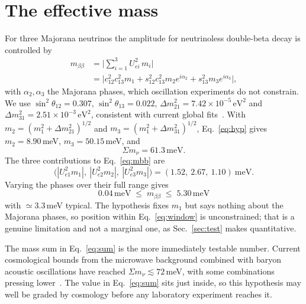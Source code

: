\documentclass[aps,prd,twocolumn,superscriptaddress,nofootinbib,10pt]{revtex4-2}
\begin{document}
\section{The effective mass}\label{sec:calc}

For three Majorana neutrinos the amplitude for neutrinoless double-beta decay is controlled by
%
\begin{equation}
  \begin{aligned}
    m_{\beta\beta} &= \Big| \sum_{i=1}^{3} U_{ei}^2\, m_i \Big| \\[2pt]
    &= \Big| c_{12}^2 c_{13}^2 m_1 + s_{12}^2 c_{13}^2 m_2 e^{i\alpha_2}
       + s_{13}^2 m_3 e^{i\alpha_3} \Big|,
  \end{aligned}
  \label{eq:mbb}
\end{equation}
%
with $\alpha_2, \alpha_3$ the Majorana phases, which oscillation experiments do not constrain. We
use $\sin^2\theta_{12} = 0.307$, $\sin^2\theta_{13} = 0.022$,
$\Delta m^2_{21} = 7.42 \times 10^{-5}\,\mathrm{eV}^2$ and
$\Delta m^2_{31} = 2.51 \times 10^{-3}\,\mathrm{eV}^2$, consistent with current global
fits~\cite{NuFIT2020,PDG2024}. With $m_2 = (m_1^2 + \Delta m^2_{21})^{1/2}$ and
$m_3 = (m_1^2 + \Delta m^2_{31})^{1/2}$, Eq.~\eqref{eq:hyp} gives
$m_2 = 8.90\,$meV, $m_3 = 50.15\,$meV, and
%
\begin{equation}
  \Sigma m_\nu = 61.3\,\mathrm{meV}.
  \label{eq:sum}
\end{equation}
%
The three contributions to Eq.~\eqref{eq:mbb} are
%
\begin{equation}
  \big( |U_{e1}^2 m_1|,\ |U_{e2}^2 m_2|,\ |U_{e3}^2 m_3| \big)
  = (1.52,\ 2.67,\ 1.10)\ \mathrm{meV}.
  \label{eq:terms}
\end{equation}
%
Varying the phases over their full range gives
%
\begin{equation}
  \boxed{\ 0.04\,\mathrm{meV} \;\le\; m_{\beta\beta} \;\le\; 5.30\,\mathrm{meV}\ }
  \label{eq:window}
\end{equation}
%
with $\simeq 3.3\,$meV typical. The hypothesis fixes $m_1$ but says nothing about the Majorana
phases, so position within Eq.~\eqref{eq:window} is unconstrained; that is a genuine limitation and
not a marginal one, as Sec.~\ref{sec:test} makes quantitative.

The mass sum in Eq.~\eqref{eq:sum} is the more immediately testable number. Current cosmological
bounds from the microwave background combined with baryon acoustic oscillations have reached
$\Sigma m_\nu \lesssim 72\,$meV, with some combinations pressing lower~\cite{DESI2024}. The value
in Eq.~\eqref{eq:sum} sits just inside, so this hypothesis may well be graded by cosmology before
any laboratory experiment reaches it.
\end{document}
